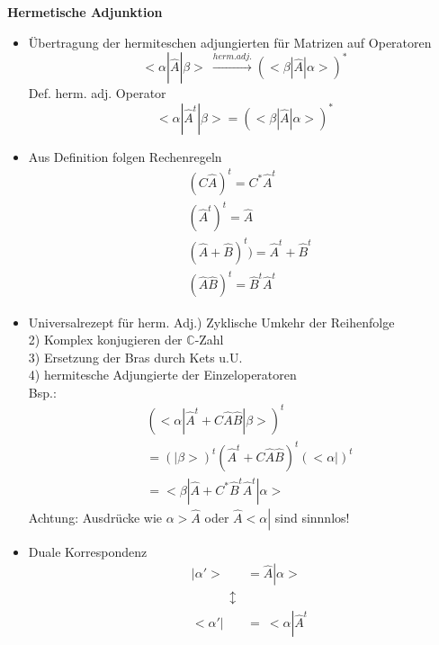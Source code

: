\documentclass[10pt,article,colorback,accentcolor=tud9d]{scrartcl}
\begin{document}
\textbf{Hermetische Adjunktion}
\begin{fleqn}
\begin{itemize}
\item Übertragung der hermiteschen adjungierten für Matrizen auf Operatoren
  \begin{equation}
  <\alpha\left|\right.\hat{A}\left|\right.\beta> \ \xrightarrow{herm. adj.} (<\beta \left|\right.\hat{A}\left|\right.\alpha>)^*
  \end{equation}
  Def. herm. adj. Operator
  \begin{equation}
  <\alpha\left|\right.{\hat{A}}^t \left|\right. \beta>=(<\beta\left|\right.\hat{A}\left|\right.\alpha>)^*
  \end{equation}
\item Aus Definition folgen Rechenregeln
  \begin{equation}
  \begin{aligned}
  &(C\hat{A})^t=C^*{\hat{A}}^t\\
  &({\hat{A}}^t)^t=\hat{A}\\
  &(\hat{A} + \hat{B})^t )= \hat{A}^t + \hat{B}^t\\
  &(\hat{A}\hat{B})^t=\hat{B}^t\hat{A}^t
  \end{aligned}
  \end{equation}
\item \onehalfspacing Universalrezept für herm. Adj.) Zyklische Umkehr der Reihenfolge\\
  2) Komplex konjugieren der $\mathbb{C}$-Zahl\\
  3) Ersetzung der Bras durch Kets u.U.\\
  4) hermitesche Adjungierte der Einzeloperatoren\\
  Bsp.:
  \begin{equation}
  \begin{aligned}
  &(<\alpha\left|\right.\hat{A}^t+C\hat{A}\hat{B}\left|\right.\beta>)^t\\
  &= (\left|\right.\beta>)^t (\hat{A}^t+C\hat{A}\hat{B})^t(<\alpha\left|\right.)^t\\
  &= <\beta\left|\right. \hat{A} +C^*\hat{B}^t \hat{A}^t \left|\right.\alpha>
  \end{aligned}
  \end{equation}
  Achtung: Ausdrücke wie $\alpha>\hat{A}$ oder $ \hat{A}<\alpha\left|\right.$ sind sinnnlos!
\item Duale Korrespondenz
  \begin{equation}
  \begin{aligned}
  &\left|\right.\alpha'>&=\hat{A}\left|\right.\alpha>\\
  & \quad \quad \quad \updownarrow&\\
  &<\alpha'\left|\right.&= \ <\alpha\left|\right.\hat{A}^t
  \end{aligned}
  \end{equation}
\end{itemize}
\end{fleqn}
\end{document}
